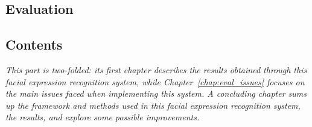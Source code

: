   \begin{titlepage}
    \vspace*{\fill}
      \part{Evaluation}
    \vspace*{\fill}
  \end{titlepage}

\startcontents[parts]
  
\chapter*{Contents}

\textit{This part is two-folded: its first chapter describes the results obtained through this facial expression recognition system, while Chapter~\ref{chap:eval_issues} focuses on the main issues faced when implementing this system. A concluding chapter sums up the framework and methods used in this facial expression recognition system, the results, and explore some possible improvements.} 

\vspace{\baselineskip}


\pagebreak


\newpage

\newpage


\stopcontents[parts]